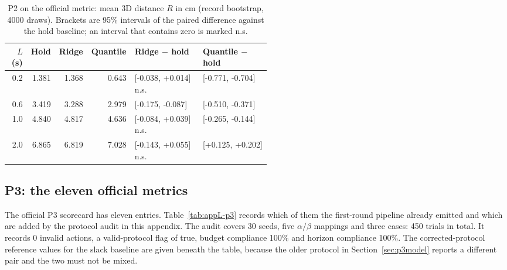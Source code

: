 \begin{table}[H]\centering\scriptsize
\caption{P2 on the official metric: mean 3D distance $R$ in cm (record bootstrap, 4000 draws). Brackets are 95\% intervals of the paired difference against the hold baseline; an interval that contains zero is marked n.s.}
\label{tab:appL-p2}
\begin{tabular}{rrrrp{0.26\linewidth}p{0.26\linewidth}}
\toprule
$L$ (s) & Hold & Ridge & Quantile & Ridge $-$ hold & Quantile $-$ hold \\
\midrule
0.2 & 1.381 & 1.368 & 0.643 & [-0.038, +0.014] n.s. & [-0.771, -0.704] \\
0.6 & 3.419 & 3.288 & 2.979 & [-0.175, -0.087] & [-0.510, -0.371] \\
1.0 & 4.840 & 4.817 & 4.636 & [-0.084, +0.039] n.s. & [-0.265, -0.144] \\
2.0 & 6.865 & 6.819 & 7.028 & [-0.143, +0.055] n.s. & [+0.125, +0.202] \\
\bottomrule\end{tabular}\end{table}

\subsection*{P3: the eleven official metrics}
The official P3 scorecard has eleven entries. Table~\ref{tab:appL-p3} records
which of them the first-round pipeline already emitted and which are added by the
protocol audit in this appendix. The audit covers 30 seeds, five $\alpha/\beta$
mappings and three cases: 450 trials in total. It records
0 invalid actions, a valid-protocol flag of
true, budget compliance 100\% and horizon
compliance 100\%. The corrected-protocol reference values for
the slack baseline are given beneath the table, because the older protocol in
Section~\ref{sec:p3model} reports a different pair and the two must not be mixed.

